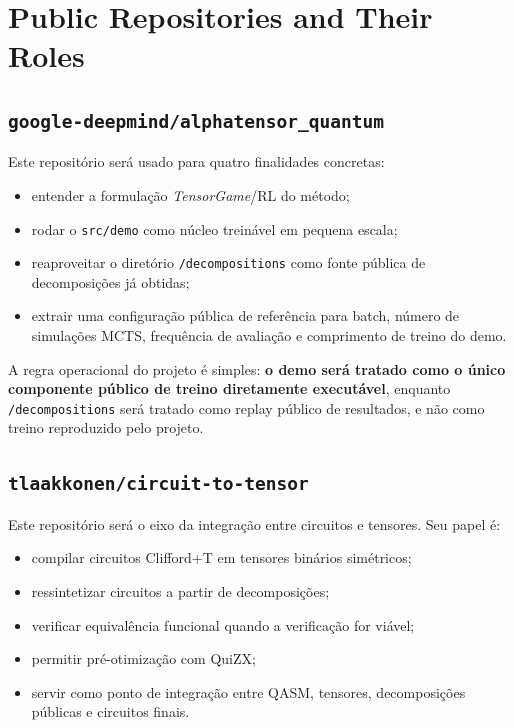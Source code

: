 \documentclass[a4paper,11pt]{article}
\begin{document}
\section{Public Repositories and Their Roles}

\subsection*{\texttt{google-deepmind/alphatensor\_quantum}}

Este repositório será usado para quatro finalidades concretas:
\begin{itemize}
  \item entender a formulação \textit{TensorGame}/RL do método;
  \item rodar o \texttt{src/demo} como núcleo treinável em pequena escala;
  \item reaproveitar o diretório \texttt{/decompositions} como fonte pública de decomposições já obtidas;
  \item extrair uma configuração pública de referência para batch, número de simulações MCTS, frequência de avaliação e comprimento de treino do demo.
\end{itemize}

A regra operacional do projeto é simples: \textbf{o demo será tratado como o único componente público de treino diretamente executável}, enquanto \texttt{/decompositions} será tratado como replay público de resultados, e não como treino reproduzido pelo projeto.

\subsection*{\texttt{tlaakkonen/circuit-to-tensor}}

Este repositório será o eixo da integração entre circuitos e tensores. Seu papel é:
\begin{itemize}
  \item compilar circuitos Clifford+T em tensores binários simétricos;
  \item ressintetizar circuitos a partir de decomposições;
  \item verificar equivalência funcional quando a verificação for viável;
  \item permitir pré-otimização com QuiZX;
  \item servir como ponto de integração entre QASM, tensores, decomposições públicas e circuitos finais.
\end{itemize}
\end{document}
